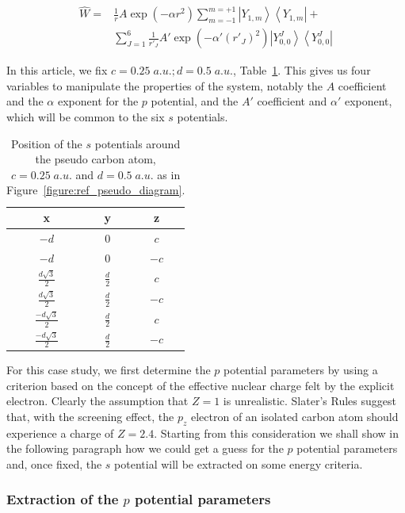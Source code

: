 \documentclass[aip]{revtex4-1}
\begin{document}
\begin{align}
\label{eq:ourPP}
\hat{W} =&
\frac{1}{r} A\exp(-\alpha r^2)\sum_{m=-1}^{m=+1}\left|Y_{1,m}\right>\left<Y_{1,m}\right|%
+\\
&\sum_{J=1}^{6} \frac{1}{r'_J} A'\exp(-\alpha' (r'_J)^2)\left|Y_{0,0}^J\right>\left<Y_{0,0}^J\right|%
\nonumber
\end{align}

In this article, we fix \(c = 0.25\;a.u.; d=0.5\;a.u.\), Table~\ref{tab:pos}.
This gives us four variables to manipulate the properties of the system, 
notably the $A$ coefficient and the $\alpha$ exponent for the $p$ potential, and
the $A'$ coefficient and $\alpha'$ exponent, which will be common to the six $s$ potentials.

\begin{table}[ht]
\caption{\label{tab:pos}Position of the $s$ potentials around the pseudo carbon atom, $c=0.25\;a.u.$ and $d=0.5\;a.u.$ as in Figure~\ref{figure:ref_pseudo_diagram}.
}
\begin{tabular}{ccc}
\hline\hline
 x & y & z                                       \\
\hline
 $-d$                   & $0$            & $ c$ \\
 $-d$                   & $0$            & $-c$ \\
 $\frac{ d\sqrt{3}}{2}$  & $\frac{d}{2}$  & $ c$ \\
 $\frac{ d\sqrt{3}}{2}$  & $\frac{d}{2}$  & $-c$ \\
 $\frac{-d\sqrt{3}}{2}$ & $\frac{d}{2}$  & $ c$ \\
 $\frac{-d\sqrt{3}}{2}$ & $\frac{d}{2}$  & $-c$ \\
\hline\hline
\end{tabular}
\end{table}

For this case study, we first determine the $p$ potential parameters by using a criterion based 
on the concept of the effective nuclear charge felt by the explicit electron.
Clearly the assumption that \(Z = 1\) is unrealistic.
Slater's Rules\cite{slatersrules} suggest that, with the screening effect, the \(p_{z}\)
electron of an isolated carbon atom should experience a charge of \(Z = 2.4\). Starting
from this consideration we shall show in the following paragraph how we could get
a guess for the  $p$ potential parameters and, once fixed,
the $s$ potential will be extracted on some energy criteria.


\subsubsection{Extraction of the $p$ potential parameters}
\end{document}
